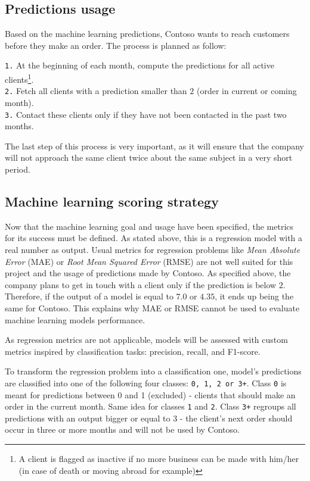 \subsection{Predictions usage}
Based on the machine learning predictions, Contoso wants to reach customers before they make an order. The process is planned as follow:

\noindent\hspace*{0.8cm}  \texttt{1.} At the beginning of each month, compute the predictions for all active clients\footnote{A client is flagged as inactive if no more business can be made with him/her (in case of death or moving abroad for example)}. \\
\hspace*{0.8cm}           \texttt{2.} Fetch all clients with a prediction smaller than $2$ (order in current or coming month). \\
\hspace*{0.8cm}           \texttt{3.} Contact these clients only if they have not been contacted in the past two months.

The last step of this process is very important, as it will ensure that the company will not approach the same client twice about the same subject in a very short period.


\subsection{Machine learning scoring strategy}
Now that the machine learning goal and usage have been specified, the metrics for its success must be defined. As stated above, this is a regression model with a real number as output. Usual metrics for regression problems like \textit{Mean Absolute Error} (MAE) or \textit{Root Mean Squared Error} (RMSE) are not well suited for this project and the usage of predictions made by Contoso. As specified above, the company plans to get in touch with a client only if the prediction is below $2$. Therefore, if the output of a model is equal to $7.0$ or $4.35$, it ends up being the same for Contoso. This explains why MAE or RMSE cannot be used to evaluate machine learning models performance. 

As regression metrics are not applicable, models will be assessed with custom metrics inspired by classification tasks: precision, recall, and F1-score. 

To transform the regression problem into a classification one, model's predictions are classified into one of the following four classes: \texttt{0, 1, 2 or 3+}. Class \texttt{0} is meant for predictions between 0 and 1 (excluded) - clients that should make an order in the current month. Same idea for classes \texttt{1} and \texttt{2}. Class \texttt{3+} regroups all predictions with an output bigger or equal to 3 - the client's next order should occur in three or more months and will not be used by Contoso.

